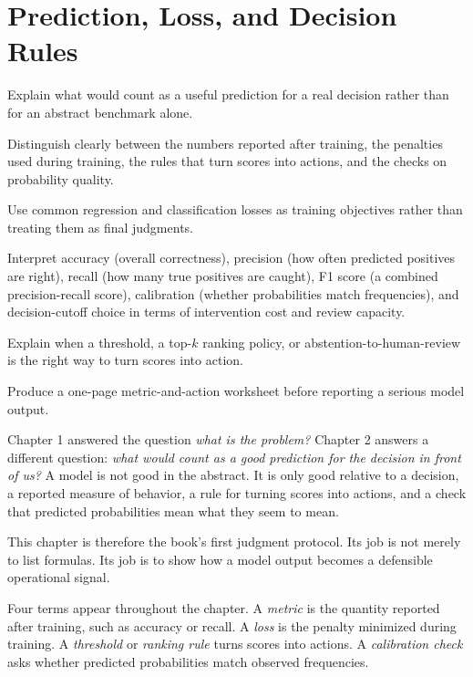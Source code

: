 \chapter{Prediction, Loss, and Decision Rules}

\begin{learninggoals}
\item Explain what would count as a useful prediction for a real decision rather than for an abstract benchmark alone.
\item Distinguish clearly between the numbers reported after training, the penalties used during training, the rules that turn scores into actions, and the checks on probability quality.
\item Use common regression and classification losses as training objectives rather than treating them as final judgments.
\item Interpret accuracy (overall correctness), precision (how often predicted positives are right), recall (how many true positives are caught), F1 score (a combined precision-recall score), calibration (whether probabilities match frequencies), and decision-cutoff choice in terms of intervention cost and review capacity.
\item Explain when a threshold, a top-$k$ ranking policy, or abstention-to-human-review is the right way to turn scores into action.
\item Produce a one-page metric-and-action worksheet before reporting a serious model output.
\end{learninggoals}

Chapter 1 answered the question \emph{what is the problem?} Chapter 2 answers a different question: \emph{what would count as a good prediction for the decision in front of us?} A model is not good in the abstract. It is only good relative to a decision, a reported measure of behavior, a rule for turning scores into actions, and a check that predicted probabilities mean what they seem to mean.

This chapter is therefore the book's first judgment protocol. Its job is not merely to list formulas. Its job is to show how a model output becomes a defensible operational signal.

Four terms appear throughout the chapter. A \emph{metric} is the quantity reported after training, such as accuracy or recall. A \emph{loss} is the penalty minimized during training. A \emph{threshold} or \emph{ranking rule} turns scores into actions. A \emph{calibration check} asks whether predicted probabilities match observed frequencies.

